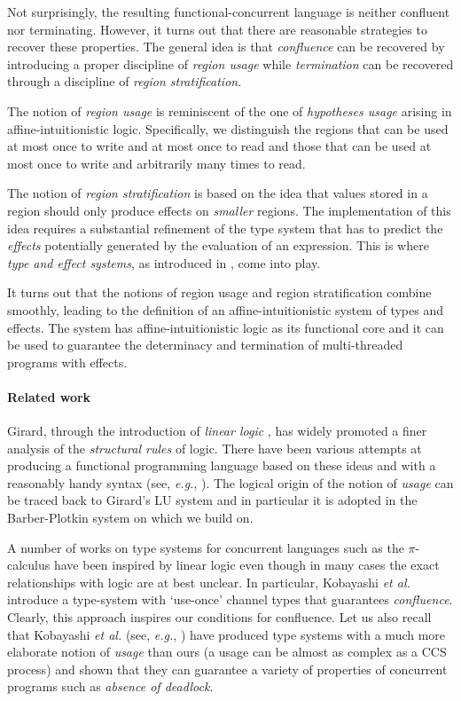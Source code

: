 \documentclass[11pt]{article}
\begin{document}
Not surprisingly, the resulting functional-concurrent language is
neither confluent nor terminating.  However, it turns out that there are reasonable
strategies to recover these properties.  The general idea is that {\em
confluence} can be recovered by introducing a proper discipline of
{\em region usage} while {\em termination} can be recovered through a
discipline of {\em region stratification}.


The notion of {\em region usage} is reminiscent 
of the one of {\em hypotheses usage} arising in affine-intuitionistic logic.
Specifically, we  distinguish the regions that can be used at most
once to write and at most once to read and those that can be used at
most once to write and arbitrarily many times to read. 

The notion of {\em region stratification} is based
on the idea that values stored in a region should only produce effects
on {\em smaller} regions.  The implementation of this idea requires a
substantial refinement of the type system that has to predict the {\em
effects} potentially generated by the evaluation of an expression.  This is 
where  {\em type and effect systems}, as introduced in
\cite{LG88}, come into play.

It turns out that the notions of region usage and region
stratification combine smoothly, leading to the definition of an
affine-intuitionistic system of types and effects. The system has
affine-intuitionistic logic as its functional core and it can be used
to guarantee the determinacy and termination of multi-threaded
programs with effects.


\paragraph{Related work}
Girard, through the introduction of {\em linear logic} \cite{Girard87}, 
has widely promoted a finer analysis of the {\em structural rules} of logic.
There have been various attempts at producing a functional programming
language based on these ideas and with a reasonably handy
syntax (see, {\em e.g.}, 
\cite{BBPH93,Benton94,Plotkin93,MOTW95,Barber96}).  The logical origin
of the notion of {\em usage} can be traced back to Girard's LU system
\cite{Girard91} and in particular it is adopted in the Barber-Plotkin system \cite{Barber96}
on which we build on.

A number of works on type systems for concurrent languages such as the
$\pi$-calculus have been inspired by linear logic even though in many cases the
exact relationships with logic are at best unclear.  In particular,
Kobayashi {\em et al.} \cite{KPT99} introduce a type-system with
`use-once' channel types that guarantees {\em confluence}.  Clearly,
this approach inspires our conditions for confluence.
Let us also recall that Kobayashi
{\em et al.} (see, {\em e.g.}, \cite{K02,IK05}) have produced type
systems with a much more elaborate notion of {\em usage} than ours (a usage can
be almost as complex as a CCS process) and shown that they can 
guarantee a variety of properties of concurrent programs such as {\em absence of
deadlock}.
\end{document}
